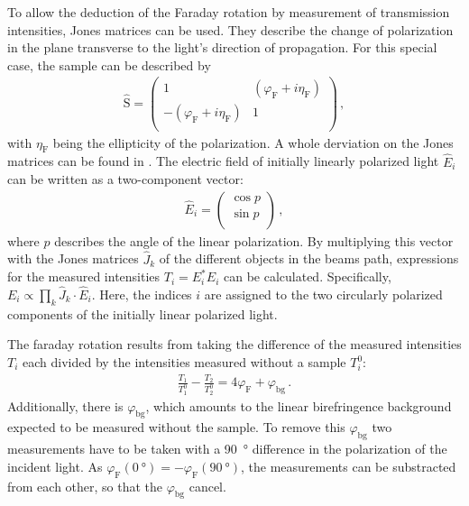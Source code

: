 	To allow the deduction of the Faraday rotation by measurement of transmission intensities, Jones matrices can be used.
	They describe the change of polarization in the plane transverse to the light's direction of propagation.
	For this special case, the sample can be described by
	\begin{align*}
		\hat{\text{S}} = \left( \begin{array}{rr}
		1 & (\varphi_\text{F} + i\eta_\text{F}) \\
		-(\varphi_\text{F} + i\eta_\text{F}) & 1 \\
	\end{array}\right) \,,
	\end{align*}
  with $\eta_\text{F}$ being the ellipticity of the polarization.
  A whole derviation on the Jones matrices can be found in \cite{arora}.
	The electric field of initially linearly polarized light $\hat{E}_i$ can be written as a two-component vector:
	\begin{align*}
		\hat{E}_i = \left( \begin{array}{r}
					\cos{p} \\
					\sin{p} \\
				\end{array}\right) \,,
	\end{align*}
	where $p$ describes the angle of the linear polarization.
	By multiplying this vector with the Jones matrices $\hat{J}_k$ of the different objects in the beams path, expressions for the measured intensities $T_i = E_i^* E_i$ can be calculated.
  Specifically, $E_i \propto \prod_k \hat{J}_k \cdot \hat{E}_i$.
  Here, the indices $i$ are assigned to the two circularly polarized components of the initially linear polarized light.

  The faraday rotation results from taking the difference of the measured intensities $T_i$ each divided by the intensities measured without a sample $T_i^0$:
	\begin{align*}
		\frac{T_1}{T_1^0} - \frac{T_2}{T_2^0} = 4 \varphi_\text{F} + \varphi_\text{bg} \,.
	\end{align*}
	Additionally, there is $\varphi_\text{bg}$, which amounts to the linear birefringence background expected to be measured without the sample.
  To remove this $\varphi_\text{bg}$ two measurements have to be taken with a \SI{90}{\degree} difference in the polarization of the incident light.
  As $\varphi_\text{F}(\SI{0}{\degree}) = -\varphi_\text{F}(\SI{90}{\degree})$, the measurements can be substracted from each other, so that the $\varphi_\text{bg}$ cancel.
